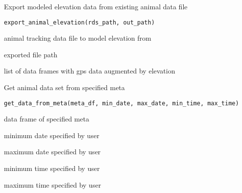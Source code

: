 \documentclass[a4paper]{book}
\begin{document}
%
\begin{Description}\relax
Export modeled elevation data from existing animal data file
\end{Description}
%
\begin{Usage}
\begin{verbatim}
export_animal_elevation(rds_path, out_path)
\end{verbatim}
\end{Usage}
%
\begin{Arguments}
\begin{ldescription}
\item[\code{rds\_path}] animal tracking data file to model elevation from

\item[\code{out\_path}] exported file path
\end{ldescription}
\end{Arguments}
%
\begin{Value}
list of data frames with gps data augmented by elevation
\end{Value}
%
\begin{Description}\relax
Get animal data set from specified meta
\end{Description}
%
\begin{Usage}
\begin{verbatim}
get_data_from_meta(meta_df, min_date, max_date, min_time, max_time)
\end{verbatim}
\end{Usage}
%
\begin{Arguments}
\begin{ldescription}
\item[\code{meta\_df}] data frame of specified meta

\item[\code{min\_date}] minimum date specified by user

\item[\code{max\_date}] maximum date specified by user

\item[\code{min\_time}] minimum time specified by user

\item[\code{max\_time}] maximum time specified by user
\end{ldescription}
\end{Arguments}
\end{document}

